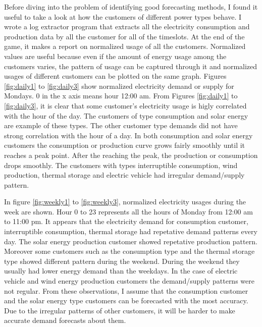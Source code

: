 Before diving into the problem of identifying good forecasting methods, I found it useful to take a look at how the customers of different power types behave. I wrote a log extractor program that extracts all the electricity consumption and production data by all the customer for all of the timeslots. At the end of the game, it makes a report on normalized usage of all the customers. Normalized values are useful because even if the amount of energy usage among the customers varies, the pattern of usage can be captured through it and normalized usages of different customers can be plotted on the same graph. Figures \ref{fig:daily1} to \ref{fig:daily3} show normalized electricity demand or supply for Mondays. 0 in the x axis means hour 12:00 am. From Figures \ref{fig:daily1} to \ref{fig:daily3}, it is clear that some customer's electricity usage is higly correlated with the hour of the day. The customers of type consumption and solar energy are example of these types. The other customer type demands did not have strong correlation with the hour of a day. In both consumption and solar energy customers the consumption or production curve grows fairly smoothly until it reaches a peak point. After the reaching the peak, the production or consumption drops smoothly. The customers with types interruptible consumption, wind production, thermal storage and electric vehicle had irregular demand/supply pattern. 

In figure \ref{fig:weekly1} to \ref{fig:weekly3}, normalized electricity usages during the week are shown. Hour 0 to 23 represents all the hours of Monday from 12:00 am to 11:00 pm. It appears that the electricity demand for consumption customer, interruptible consumption, thermal storage had repetative demand patterns every day. The  solar energy production customer showed repetative production pattern. Moreover some customers such as the consumption type and the thermal storage type showed different pattern during the weekend. During the weekend they usually had lower energy demand than the weekdays. In the case of electric vehicle and wind energy production customers the demand/supply patterns were not regular. From these observations, I assume that the consumption customer and the solar energy type customers can be forecasted with the most accuracy. Due to the irregular patterns of other customers, it will be harder to make accurate demand forecasts about them.
 
